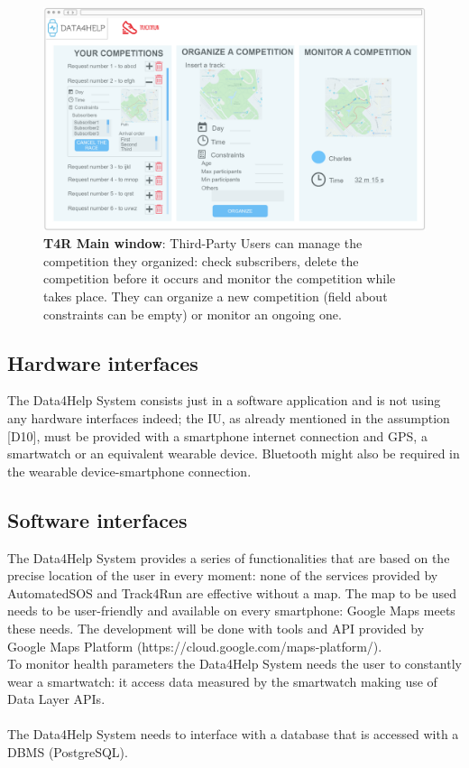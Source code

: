 \begin{figure}[H]
\centering
\includegraphics[scale = 0.5]{Mocks/Desktop_T4R_Main.PNG}
\caption{\textbf{T4R Main window}: Third-Party Users can manage the competition they organized: check subscribers, delete the competition before it occurs and monitor the competition while takes place. They can organize a new competition (field about constraints can be empty) or monitor an ongoing one. }
\end{figure}

\subsection{Hardware interfaces}
The Data4Help System consists just in a software application and is not using any hardware interfaces indeed; the IU, as already mentioned in the assumption [D10], must be provided with a smartphone internet connection and GPS, a smartwatch or an equivalent wearable device. Bluetooth might also be required in the wearable device-smartphone connection.  \\
\subsection{Software interfaces}
The Data4Help System provides a series of functionalities that are based on the precise location of the user in every moment: none of the services provided by AutomatedSOS and Track4Run are effective without a map. The map to be used needs to be user-friendly and available on every smartphone: Google Maps meets these needs. The development will be done with tools and API provided by Google Maps Platform (https://cloud.google.com/maps-platform/).  \\
To monitor health parameters the Data4Help System needs the user to constantly wear a smartwatch:
it access data measured by the smartwatch making use of Data Layer APIs.\\
\\
The Data4Help System needs to interface with a database that is accessed with a DBMS (PostgreSQL). 


